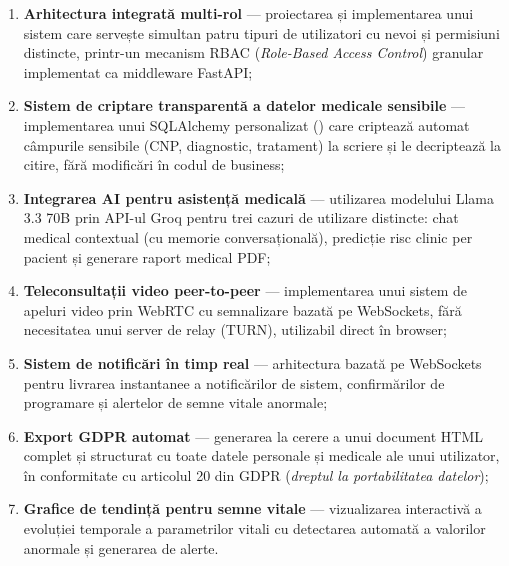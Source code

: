 \begin{enumerate}
  \item \textbf{Arhitectura integrată multi-rol} — proiectarea și implementarea unui sistem care servește simultan patru tipuri de utilizatori cu nevoi și permisiuni distincte, printr-un mecanism RBAC (\textit{Role-Based Access Control}) granular implementat ca middleware FastAPI;

  \item \textbf{Sistem de criptare transparentă a datelor medicale sensibile} — implementarea unui  SQLAlchemy personalizat () care criptează automat câmpurile sensibile (CNP, diagnostic, tratament) la scriere și le decriptează la citire, fără modificări în codul de business;

  \item \textbf{Integrarea AI pentru asistență medicală} — utilizarea modelului Llama 3.3 70B prin API-ul Groq pentru trei cazuri de utilizare distincte: chat medical contextual (cu memorie conversațională), predicție risc clinic per pacient și generare raport medical PDF;

  \item \textbf{Teleconsultații video peer-to-peer} — implementarea unui sistem de apeluri video prin WebRTC cu semnalizare bazată pe WebSockets, fără necesitatea unui server de relay (TURN), utilizabil direct în browser;

  \item \textbf{Sistem de notificări în timp real} — arhitectura bazată pe WebSockets pentru livrarea instantanee a notificărilor de sistem, confirmărilor de programare și alertelor de semne vitale anormale;

  \item \textbf{Export GDPR automat} — generarea la cerere a unui document HTML complet și structurat cu toate datele personale și medicale ale unui utilizator, în conformitate cu articolul 20 din GDPR (\textit{dreptul la portabilitatea datelor});

  \item \textbf{Grafice de tendință pentru semne vitale} — vizualizarea interactivă a evoluției temporale a parametrilor vitali cu detectarea automată a valorilor anormale și generarea de alerte.
\end{enumerate}
